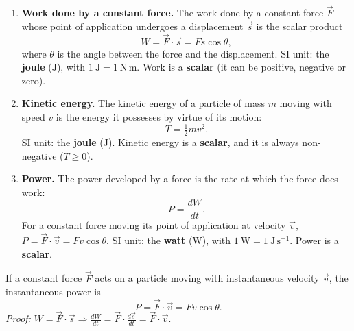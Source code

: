 \documentclass[11pt]{article}
\begin{document}
\begin{corrige}
\begin{enumerate}
\item \textbf{Work done by a constant force.} The work done by a constant force $\vec{F}$ whose point of application undergoes a displacement $\vec{s}$ is the scalar product
\[
W = \vec{F}\cdot\vec{s} = Fs\cos\theta,
\]
where $\theta$ is the angle between the force and the displacement. SI unit: the \textbf{joule} ($\mathrm{J}$), with $1\ \mathrm{J} = 1\ \mathrm{N\,m}$. Work is a \textbf{scalar} (it can be positive, negative or zero).

\item \textbf{Kinetic energy.} The kinetic energy of a particle of mass $m$ moving with speed $v$ is the energy it possesses by virtue of its motion:
\[
T = \tfrac{1}{2}mv^{2}.
\]
SI unit: the \textbf{joule} ($\mathrm{J}$). Kinetic energy is a \textbf{scalar}, and it is always non-negative ($T \ge 0$).

\item \textbf{Power.} The power developed by a force is the rate at which the force does work:
\[
P = \frac{dW}{dt}.
\]
For a constant force moving its point of application at velocity $\vec{v}$, $P = \vec{F}\cdot\vec{v} = Fv\cos\theta$. SI unit: the \textbf{watt} ($\mathrm{W}$), with $1\ \mathrm{W} = 1\ \mathrm{J\,s^{-1}}$. Power is a \textbf{scalar}.
\end{enumerate}

\begin{propriete}
If a constant force $\vec{F}$ acts on a particle moving with instantaneous velocity $\vec{v}$, the instantaneous power is
\[
P = \vec{F} \cdot \vec{v} = Fv\cos\theta.
\]
\textit{Proof:} $W = \vec{F}\cdot\vec{s} \Rightarrow \frac{dW}{dt} = \vec{F}\cdot\frac{d\vec{s}}{dt} = \vec{F}\cdot\vec{v}$.
\end{propriete}
\end{corrige}
\end{document}
